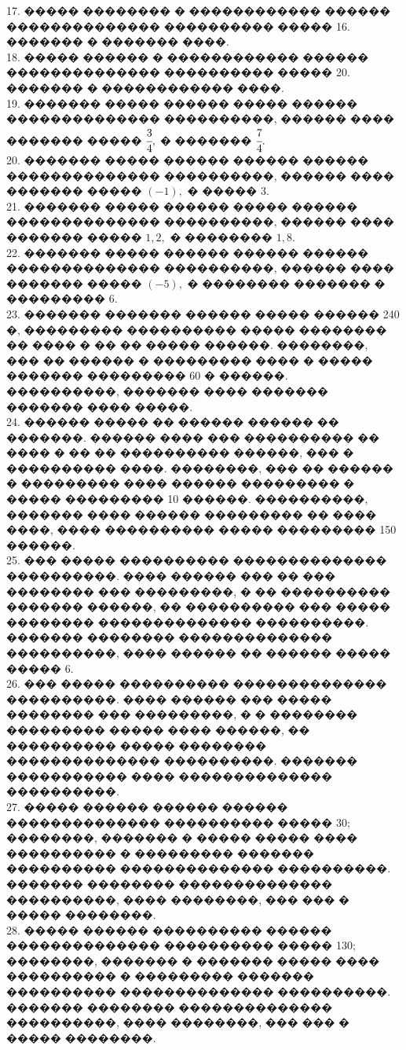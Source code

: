 \documentclass[12pt]{article}
\begin{document}
17. ����� �������� � ������������ ������ �������������� ���������� ����� 16. ������� � ������� ����.\\
18. ����� ������ � ������������ ������ �������������� ���������� ����� 20. ������� � ������������ ����.\\
19. ������� ����� ������ ����� ������ �������������� ����������, ������ ���� ������� ����� $\cfrac{3}{4},$ � ������� $\cfrac{7}{4}.$\\
20. ������� ����� ������ ������ ������ �������������� ����������, ������ ���� ������� ����� $(-1),$ � ����� $3.$\\
21. ������� ����� ������ ����� ������ �������������� ����������, ������ ���� ������� ����� $1,2,$ � �������� $1,8.$\\
22. ������� ����� ������ ������ ������ �������������� ����������, ������ ���� ������� ����� $(-5),$ � �������� ������� � ��������� $6.$\\
23. ������� ������� ������ ����� ������ 240 �, ��������� ���������� ����� �������� �� ���� � �� �� ����� ������. ��������, ��� �� ������ � ��������� ���� � ����� ������� ��������� 60 � ������. ����������, ������� ���� ������� ������� ���� �����.\\
24. ������ ����� �� ������ ������ �� �������. ������ ���� ��� ���������� �� ���� � �� �� ���������� ������, ��� � ���������� ����. ��������, ��� �� ������ � ��������� ���� ������ ��������� � ����� ��������� 10 ������. ����������, ������� ���� ������ ��������� �� ���� ����, ���� ���������� ����� ��������� 150 ������.\\
25. ��� ����� ���������� �������������� ����������. ���� ������ ��� �� ��� �������� ��� ���������, � �� ���������� ������� ������, �� ���������� ��� ����� �������� �������������� ����������. ������� �������� �������������� ����������, ���� ������ �� ������ ����� ����� 6.\\
26. ��� ����� ���������� �������������� ����������. ���� ������ ��� ����� �������� ��� ���������, � � �������� ��������� ����� ���� ������, �� ���������� ����� �������� �������������� ����������. ������� ����������� ���� �������������� ����������.\\
27. ����� ������ ������ ������ �������������� ���������� ����� 30; ��������, ������� � ����� ����� ���� ���������� � ��������� ������� ���������� �������������� ����������. ������� �������� �������������� ����������, ���� ��������, ��� ��� � ����� ��������.\\
28. ����� ������ ���������� ������ �������������� ���������� ����� 130; ��������, ������� � ������� ����� ���� ���������� � ��������� ������� ���������� �������������� ����������. ������� �������� �������������� ����������, ���� ��������, ��� ��� � ����� ��������.\\
\end{document}
